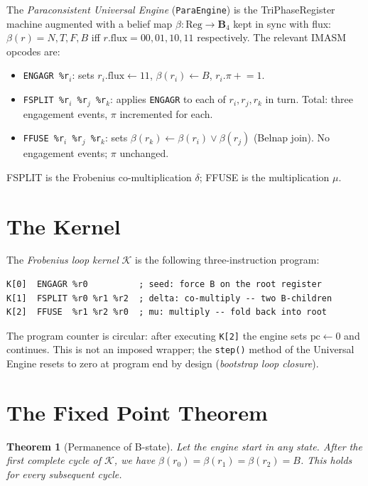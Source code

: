 \documentclass[12pt,a4paper]{article}
\newtheorem{theorem}{Theorem}
\theoremstyle{definition}
\theoremstyle{remark}
\begin{document}
The \emph{Paraconsistent Universal Engine} (\texttt{ParaEngine}) is the
TriPhaseRegister machine augmented with a belief map
$\beta : \mathrm{Reg} \to \mathbf{B}_4$ kept in sync with flux:
$\beta(r) = N, T, F, B$ iff $r.\mathrm{flux} = 00, 01, 10, 11$
respectively.  The relevant IMASM opcodes are:

\begin{itemize}
  \item \texttt{ENGAGR \%r$_i$}: sets $r_i.\mathrm{flux} \leftarrow 11$,
        $\beta(r_i) \leftarrow B$, $r_i.\pi \mathrel{+}= 1$.
  \item \texttt{FSPLIT \%r$_i$ \%r$_j$ \%r$_k$}: applies \texttt{ENGAGR}
        to each of $r_i, r_j, r_k$ in turn.  Total: three engagement events,
        $\pi$ incremented for each.
  \item \texttt{FFUSE \%r$_i$ \%r$_j$ \%r$_k$}: sets
        $\beta(r_k) \leftarrow \beta(r_i) \vee \beta(r_j)$ (Belnap join).
        No engagement events; $\pi$ unchanged.
\end{itemize}

FSPLIT is the Frobenius co-multiplication $\delta$; FFUSE is the
multiplication $\mu$.

\section{The Kernel}

The \emph{Frobenius loop kernel} $\mathcal{K}$ is the following
three-instruction program:

\begin{lstlisting}[caption={Frobenius loop kernel},label={lst:kernel}]
K[0]  ENGAGR %r0          ; seed: force B on the root register
K[1]  FSPLIT %r0 %r1 %r2  ; delta: co-multiply -- two B-children
K[2]  FFUSE  %r1 %r2 %r0  ; mu: multiply -- fold back into root
\end{lstlisting}

The program counter is circular: after executing \texttt{K[2]} the engine
sets $\mathrm{pc} \leftarrow 0$ and continues.  This is not an imposed
wrapper; the \texttt{step()} method of the Universal Engine resets to zero
at program end by design (\emph{bootstrap loop closure}).

\section{The Fixed Point Theorem}

\begin{theorem}[Permanence of B-state]
\label{thm:permanent-b}
Let the engine start in any state.  After the first complete cycle of
$\mathcal{K}$, we have $\beta(r_0) = \beta(r_1) = \beta(r_2) = B$.  This
holds for every subsequent cycle.
\end{theorem}
\end{document}
